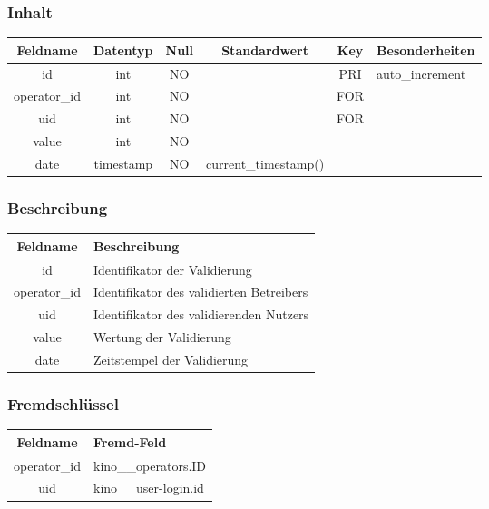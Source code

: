 \subsubsection{Inhalt}
\begin{table}[H]
	\begin{tabular}{|c|c|c|c|c|p{3.5cm}|}
		\hline
		\textbf{Feldname} & \textbf{Datentyp} & \textbf{Null} & \textbf{Standardwert} & \textbf{Key}   & \textbf{Besonderheiten} \\ \hline
		id & int & NO &  & PRI & auto\_increment \\ \hline
		operator\_id & int & NO &  & FOR & \\ \hline
		uid & int & NO &  & FOR & \\ \hline
		value & int & NO &  &  & \\ \hline
		date & timestamp & NO & current\_timestamp() &  & \\ \hline
	\end{tabular}
\end{table}
\subsubsection{Beschreibung}
\begin{table}[H]
	\begin{tabular}{|c|p{12cm}|}
		\hline
		\textbf{Feldname} & \textbf{Beschreibung} \\ \hline
		id & Identifikator der Validierung \\ \hline
		operator\_id & Identifikator des validierten Betreibers \\ \hline
		uid & Identifikator des validierenden Nutzers \\ \hline
		value & Wertung der Validierung \\ \hline
		date & Zeitstempel der Validierung \\ \hline
	\end{tabular}
\end{table}
\subsubsection{Fremdschlüssel}
\begin{table}[H]
	\begin{tabular}{|c|p{12.5cm}|}
		\hline
		\textbf{Feldname} & \textbf{Fremd-Feld} \\ \hline
		operator\_id & kino\_\_operators.ID \\ \hline
		uid & kino\_\_user-login.id \\ \hline
	\end{tabular}
\end{table}
